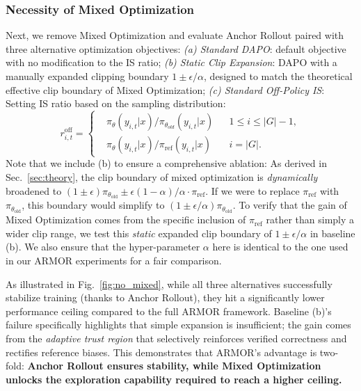 \subsubsection{Necessity of Mixed Optimization}\label{sec:mix_ablation}
Next, we remove Mixed Optimization and evaluate Anchor Rollout paired with three alternative optimization objectives:
\textit{(a) Standard DAPO}: default objective with no modification to the IS ratio;
\textit{(b) Static Clip Expansion}: DAPO with a manually expanded clipping boundary $1\pm\epsilon/\alpha$, designed to match the theoretical effective clip boundary of Mixed Optimization;
\textit{(c) Standard Off-Policy IS}: Setting IS ratio based on the sampling distribution:
$$
r_{i,t}^\text{off} = \left\{
\begin{aligned}
&{\pi_\theta}(y_{i,t}|x)/{\pi_{\theta_{old}}(y_{i,t}|x)} && 1\le i \le |G|-1,\\
&{\pi_\theta(y_{i,t}|x)}/{\pi_\mathrm{ref}(y_{i,t}|x)} && i=|G|.
\end{aligned}
\right.
$$
Note that we include (b) to ensure a comprehensive ablation:
As derived in Sec.~\ref{sec:theory}, the clip boundary of mixed optimization is \textit{dynamically} broadened to $(1\pm\epsilon)\pi_{\theta_\text{old}}\pm\epsilon(1-\alpha)/\alpha\cdot\pi_\text{ref}$.
If we were to replace $\pi_\text{ref}$ with $\pi_{\theta_\text{old}}$, this boundary would simplify to $(1\pm\epsilon/\alpha)\pi_{\theta_\text{old}}$.
To verify that the gain of Mixed Optimization comes from the specific inclusion of $\pi_\text{ref}$ rather than simply a wider clip range, we test this \textit{static} expanded clip boundary of $1\pm\epsilon/\alpha$ in baseline (b).
We also ensure that the hyper-parameter $\alpha$ here is identical to the one used in our ARMOR experiments for a fair comparison.

As illustrated in Fig.~\ref{fig:no_mixed}, while all three alternatives successfully stabilize training (thanks to Anchor Rollout), they hit a significantly lower performance ceiling compared to the full ARMOR framework.
Baseline (b)'s failure specifically highlights that simple expansion is insufficient; the gain comes from the \textit{adaptive trust region} that selectively reinforces verified correctness and rectifies reference biases.
This demonstrates that ARMOR’s advantage is two-fold: \textbf{Anchor Rollout ensures stability, while Mixed Optimization unlocks the exploration capability required to reach a higher ceiling.}

